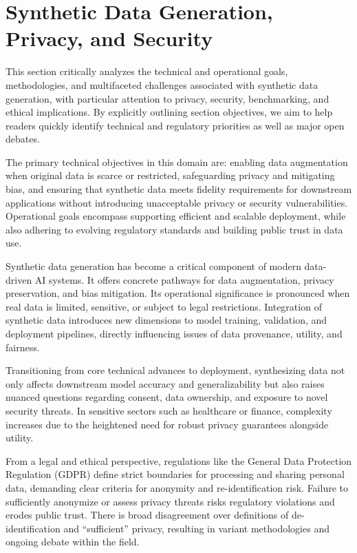 \documentclass[sigconf]{acmart}
\begin{document}
\section{Synthetic Data Generation, Privacy, and Security}

This section critically analyzes the technical and operational goals, methodologies, and multifaceted challenges associated with synthetic data generation, with particular attention to privacy, security, benchmarking, and ethical implications. By explicitly outlining section objectives, we aim to help readers quickly identify technical and regulatory priorities as well as major open debates.

The primary technical objectives in this domain are: enabling data augmentation when original data is scarce or restricted, safeguarding privacy and mitigating bias, and ensuring that synthetic data meets fidelity requirements for downstream applications without introducing unacceptable privacy or security vulnerabilities. Operational goals encompass supporting efficient and scalable deployment, while also adhering to evolving regulatory standards and building public trust in data use.

Synthetic data generation has become a critical component of modern data-driven AI systems. It offers concrete pathways for data augmentation, privacy preservation, and bias mitigation. Its operational significance is pronounced when real data is limited, sensitive, or subject to legal restrictions. Integration of synthetic data introduces new dimensions to model training, validation, and deployment pipelines, directly influencing issues of data provenance, utility, and fairness.

Transitioning from core technical advances to deployment, synthesizing data not only affects downstream model accuracy and generalizability but also raises nuanced questions regarding consent, data ownership, and exposure to novel security threats. In sensitive sectors such as healthcare or finance, complexity increases due to the heightened need for robust privacy guarantees alongside utility.

From a legal and ethical perspective, regulations like the General Data Protection Regulation (GDPR) define strict boundaries for processing and sharing personal data, demanding clear criteria for anonymity and re-identification risk. Failure to sufficiently anonymize or assess privacy threats risks regulatory violations and erodes public trust. There is broad disagreement over definitions of de-identification and “sufficient” privacy, resulting in variant methodologies and ongoing debate within the field.
\end{document}

